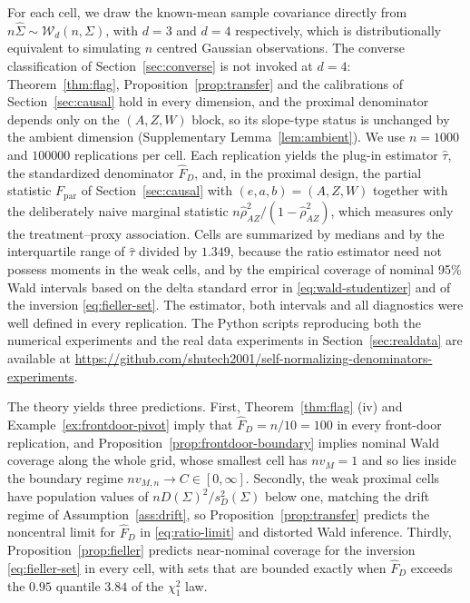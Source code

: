 \documentclass[12pt,a4paper]{article}
\theoremstyle{plain}
\theoremstyle{definition}
\newcommand{\Sighat}{\hat{\Sigma}}
\newcommand{\FD}{\widehat{F}_D}
\begin{document}
For each cell, we draw the known-mean sample covariance directly from $n\Sighat\sim\mathcal{W}_d(n,\Sigma)$, with $d=3$ and $d=4$ respectively, which is distributionally equivalent to simulating $n$ centred Gaussian observations.
The converse classification of Section~\ref{sec:converse} is not invoked at $d=4$:
Theorem~\ref{thm:flag}, Proposition~\ref{prop:transfer} and the calibrations of Section~\ref{sec:causal} hold in every dimension, and the proximal denominator depends only on the $(A,Z,W)$ block, so its slope-type status is unchanged by the ambient dimension (Supplementary Lemma~\ref{lem:ambient}).
We use $n=1000$ and $100000$ replications per cell.
Each replication yields the plug-in estimator $\hat{\tau}$, the standardized denominator $\FD$, and, in the proximal design, the partial statistic $F_{\mathrm{par}}$ of Section~\ref{sec:causal} with $(e,a,b)=(A,Z,W)$ together with the deliberately naive marginal statistic $n\hat{\rho}_{AZ}^2/(1-\hat{\rho}_{AZ}^2)$, which measures only the treatment--proxy association.
Cells are summarized by medians and by the interquartile range of $\hat{\tau}$ divided by $1.349$, because the ratio estimator need not possess moments in the weak cells, and by the empirical coverage of nominal 95\% Wald intervals based on the delta standard error in \eqref{eq:wald-studentizer} and of the inversion \eqref{eq:fieller-set}.
The estimator, both intervals and all diagnostics were well defined in every replication.
The Python scripts reproducing both the numerical experiments and the real data experiments in Section~\ref{sec:realdata} are available at \url{https://github.com/shutech2001/self-normalizing-denominators-experiments}.

The theory yields three predictions.
First, Theorem~\ref{thm:flag} (iv) and Example~\ref{ex:frontdoor-pivot} imply that $\FD=n/10=100$ in every front-door replication, and Proposition~\ref{prop:frontdoor-boundary} implies nominal Wald coverage along the whole grid, whose smallest cell has $nv_M=1$ and so lies inside the boundary regime $nv_{M,n}\to C\in[0,\infty]$.
Secondly, the weak proximal cells have population values of $nD(\Sigma)^2/s_D^2(\Sigma)$ below one, matching the drift regime of Assumption~\ref{ass:drift}, so Proposition~\ref{prop:transfer} predicts the noncentral limit for $\FD$ in \eqref{eq:ratio-limit} and distorted Wald inference.
Thirdly, Proposition~\ref{prop:fieller} predicts near-nominal coverage for the inversion \eqref{eq:fieller-set} in every cell, with sets that are bounded exactly when $\FD$ exceeds the $0.95$ quantile $3.84$ of the $\chi^2_1$ law.
\end{document}

